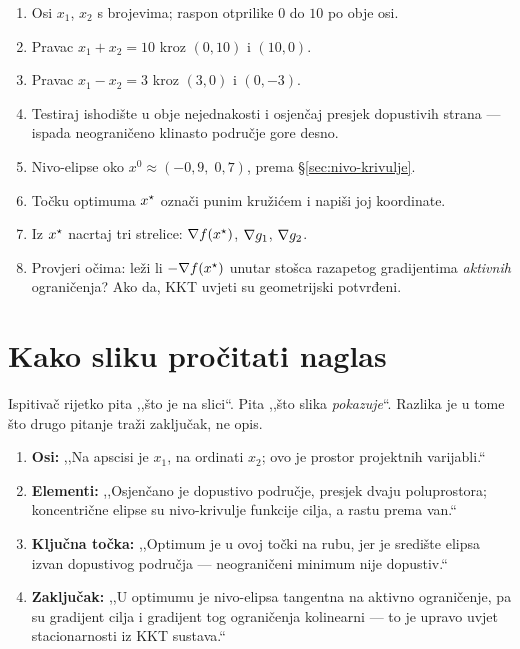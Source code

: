 \begin{korak}
\begin{enumerate}[leftmargin=*]
  \item Osi $x_1$, $x_2$ s brojevima; raspon otprilike $0$ do $10$ po obje osi.
  \item Pravac $x_1 + x_2 = 10$ kroz $(0,10)$ i $(10,0)$.
  \item Pravac $x_1 - x_2 = 3$ kroz $(3,0)$ i $(0,-3)$.
  \item Testiraj ishodište u obje nejednakosti i osjenčaj presjek dopustivih
        strana --- ispada neograničeno klinasto područje gore desno.
  \item Nivo-elipse oko $x^{0} \approx (-0{,}9,\; 0{,}7)$, prema
        \S\ref{sec:nivo-krivulje}.
  \item Točku optimuma $x^{\star}$ označi punim kružićem i napiši joj koordinate.
  \item Iz $x^{\star}$ nacrtaj tri strelice: $\nabla f(x^{\star})$, $\nabla g_1$, $\nabla g_2$.
  \item Provjeri očima: leži li $-\nabla f(x^{\star})$ unutar stošca razapetog
        gradijentima \emph{aktivnih} ograničenja? Ako da, KKT uvjeti su
        geometrijski potvrđeni.
\end{enumerate}
\end{korak}

\section{Kako sliku pročitati naglas}
\label{sec:citanje-slike}

Ispitivač rijetko pita ,,što je na slici``. Pita ,,što slika \emph{pokazuje}``.
Razlika je u tome što drugo pitanje traži zaključak, ne opis.

\begin{izgovor}
\begin{enumerate}[leftmargin=*]
  \item \textbf{Osi:} ,,Na apscisi je $x_1$, na ordinati $x_2$; ovo je prostor
        projektnih varijabli.``
  \item \textbf{Elementi:} ,,Osjenčano je dopustivo područje, presjek dvaju
        poluprostora; koncentrične elipse su nivo-krivulje funkcije cilja, a
        rastu prema van.``
  \item \textbf{Ključna točka:} ,,Optimum je u ovoj točki na rubu, jer je
        središte elipsa izvan dopustivog područja --- neograničeni minimum nije
        dopustiv.``
  \item \textbf{Zaključak:} ,,U optimumu je nivo-elipsa tangentna na aktivno
        ograničenje, pa su gradijent cilja i gradijent tog ograničenja
        kolinearni --- to je upravo uvjet stacionarnosti iz KKT sustava.``
\end{enumerate}
\end{izgovor}

